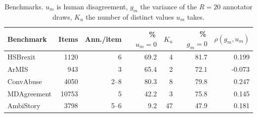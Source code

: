 \begin{table}[t]
\centering
\small
\begin{tabular}{lrrrrrr}
\hline
Benchmark & Items & Ann./item & \%\,$u_m{=}0$ & $K_u$ & \%\,$g_m{=}0$ & $\rho(g_m,u_m)$ \\
\hline
HSBrexit & 1120 & 6 & 69.2 & 4 & 81.7 & 0.199 \\
ArMIS & 943 & 3 & 65.4 & 2 & 72.1 & -0.073 \\
ConvAbuse & 4050 & 2--8 & 80.3 & 8 & 79.8 & 0.247 \\
MDAgreement & 10753 & 5 & 42.2 & 3 & 75.8 & 0.145 \\
AmbiStory & 3798 & 5--6 & 9.2 & 47 & 47.9 & 0.181 \\
\hline
\end{tabular}
\caption{Benchmarks. $u_m$ is human disagreement, $g_m$ the variance of the $R=20$ annotator draws, $K_u$ the number of distinct values $u_m$ takes.}
\label{tab:data}
\end{table}